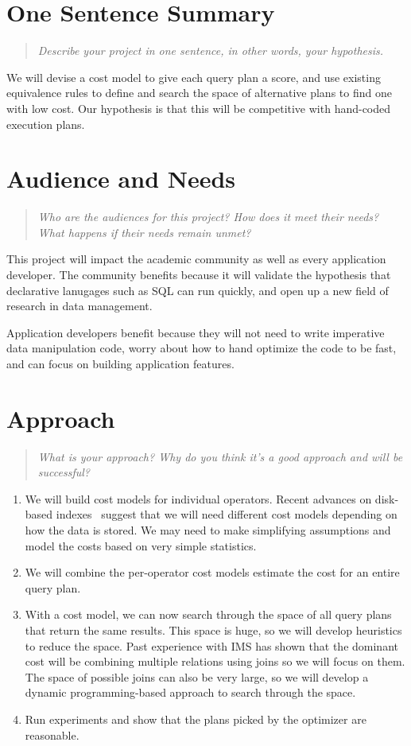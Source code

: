 \documentclass[10pt, sigconf]{acmart}
\begin{document}
\section{One Sentence Summary}
\begin{quote}
\emph{Describe your project in one sentence, in other words, your hypothesis.}
\end{quote}

We will devise a cost model to give each query plan a score, and use existing equivalence rules to define and search the space of alternative plans to find one with low cost.  Our hypothesis is that this will be competitive with hand-coded execution plans.

\section{Audience and Needs}
\begin{quote}
\emph{Who are the audiences for this project? 
How does it meet their needs? 
What happens if their needs remain unmet?}
\end{quote}

This project will impact the academic community as well as every application developer.
The community benefits because it will validate the hypothesis that declarative lanugages such as SQL can run quickly, and open up a new field of research in data management.

Application developers benefit because they will not need to write imperative data manipulation code, worry about how to hand optimize the code to be fast, and can focus on building application features.

\section{Approach}
\begin{quote}
\emph{What is your approach?
Why do you think it's a good approach and will be successful?}
\end{quote}

\begin{enumerate}
\item We will build cost models for individual operators.  Recent advances on disk-based indexes~\cite{bayer2002organization} suggest that we will need different cost models depending on how the data is stored.  We may need to make simplifying assumptions and model the costs based on very simple statistics.
\item We will combine the per-operator cost models estimate the cost for an entire query plan.
\item With a cost model, we can now search through the space of all query plans that return the same results.  This space is huge, so we will develop heuristics to reduce the space.   Past experience with IMS has shown that the dominant cost will be combining multiple relations using joins so we will focus on them. The space of possible joins can also be very large, so we will develop a dynamic programming-based approach to search through the space.
\item Run experiments and show that the plans picked by the optimizer are reasonable.
\end{enumerate}
\end{document}
